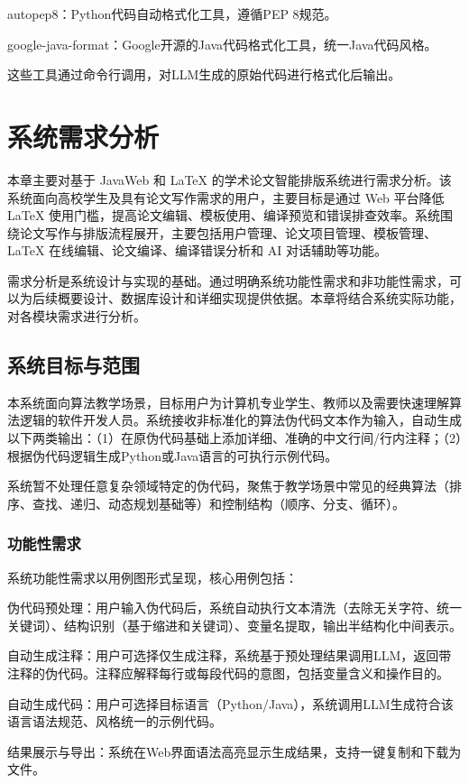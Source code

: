 \documentclass[twoside,openright]{xduugthesis}
\begin{document}
autopep8：Python代码自动格式化工具，遵循PEP 8规范。

google-java-format：Google开源的Java代码格式化工具，统一Java代码风格。

这些工具通过命令行调用，对LLM生成的原始代码进行格式化后输出。


\chapter{系统需求分析}
本章主要对基于 JavaWeb 和 LaTeX 的学术论文智能排版系统进行需求分析。该系统面向高校学生及具有论文写作需求的用户，主要目标是通过 Web 平台降低 LaTeX 使用门槛，提高论文编辑、模板使用、编译预览和错误排查效率。系统围绕论文写作与排版流程展开，主要包括用户管理、论文项目管理、模板管理、LaTeX 在线编辑、论文编译、编译错误分析和 AI 对话辅助等功能。

需求分析是系统设计与实现的基础。通过明确系统功能性需求和非功能性需求，可以为后续概要设计、数据库设计和详细实现提供依据。本章将结合系统实际功能，对各模块需求进行分析。

\section{系统目标与范围}
本系统面向算法教学场景，目标用户为计算机专业学生、教师以及需要快速理解算法逻辑的软件开发人员。系统接收非标准化的算法伪代码文本作为输入，自动生成以下两类输出：（1）在原伪代码基础上添加详细、准确的中文行间/行内注释；（2）根据伪代码逻辑生成Python或Java语言的可执行示例代码。

系统暂不处理任意复杂领域特定的伪代码，聚焦于教学场景中常见的经典算法（排序、查找、递归、动态规划基础等）和控制结构（顺序、分支、循环）。

\subsection{功能性需求}
系统功能性需求以用例图形式呈现，核心用例包括：

伪代码预处理：用户输入伪代码后，系统自动执行文本清洗（去除无关字符、统一关键词）、结构识别（基于缩进和关键词）、变量名提取，输出半结构化中间表示。

自动生成注释：用户可选择仅生成注释，系统基于预处理结果调用LLM，返回带注释的伪代码。注释应解释每行或每段代码的意图，包括变量含义和操作目的。

自动生成代码：用户可选择目标语言（Python/Java），系统调用LLM生成符合该语言语法规范、风格统一的示例代码。

结果展示与导出：系统在Web界面语法高亮显示生成结果，支持一键复制和下载为文件。
\end{document}
